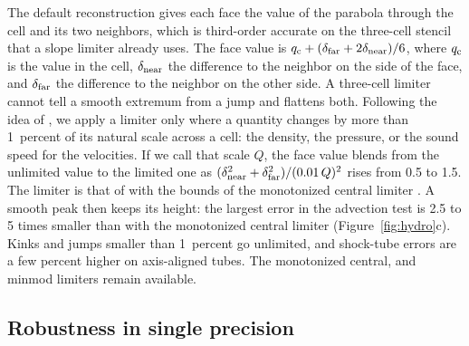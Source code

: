 \documentclass[twocolumn]{aastex701}
\begin{document}
The default reconstruction gives each face the value of the parabola through the cell and its two neighbors, which is third-order accurate on the three-cell stencil that a slope limiter already uses. The face value is $q_{\rm c} + (\delta_{\rm far} + 2\delta_{\rm near})/6$, where $q_{\rm c}$ is the value in the cell, $\delta_{\rm near}$ the difference to the neighbor on the side of the face, and $\delta_{\rm far}$ the difference to the neighbor on the other side. A three-cell limiter cannot tell a smooth extremum from a jump and flattens both. Following the idea of \citet{Cada2009}, we apply a limiter only where a quantity changes by more than 1~percent of its natural scale across a cell: the density, the pressure, or the sound speed for the velocities. If we call that scale $Q$, the face value blends from the unlimited value to the limited one as $(\delta_{\rm near}^2 + \delta_{\rm far}^2)/(0.01\,Q)^2$ rises from 0.5 to 1.5. The limiter is that of \citet{Koren1993} with the bounds of the monotonized central limiter \citep{vanLeer1977}. A smooth peak then keeps its height: the largest error in the advection test is 2.5 to 5 times smaller than with the monotonized central limiter (Figure~\ref{fig:hydro}c). Kinks and jumps smaller than 1~percent go unlimited, and shock-tube errors are a few percent higher on axis-aligned tubes. The monotonized central, \citet{vanLeer1974} and minmod \citep[e.g.,][]{Roe1986} limiters remain available.

\subsection{Robustness in single precision}
\label{sec:robustness}
\end{document}
